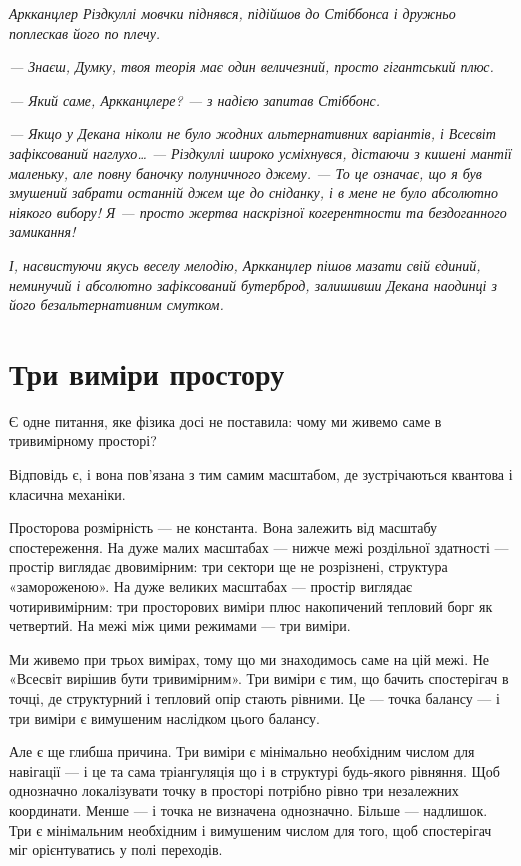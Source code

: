\documentclass[12pt, a4paper, openany]{book}
\begin{document}
\begin{terrybox}
\textit{Аркканцлер Різдкуллі мовчки піднявся, підійшов до Стіббонса і дружньо поплескав його по плечу.}

\textit{--- Знаєш, Думку, твоя теорія має один величезний, просто гігантський плюс.}

\textit{--- Який саме, Аркканцлере? --- з надією запитав Стіббонс.}

\textit{--- Якщо у Декана ніколи не було жодних альтернативних варіантів, і Всесвіт зафіксований наглухо\ldots{} --- Різдкуллі широко усміхнувся, дістаючи з кишені мантії маленьку, але повну баночку полуничного джему. --- То це означає, що я \emph{був змушений} забрати останній джем ще до сніданку, і в мене не було абсолютно ніякого вибору! Я --- просто жертва наскрізної когерентности та бездоганного замикання!}

\textit{І, насвистуючи якусь веселу мелодію, Аркканцлер пішов мазати свій єдиний, неминучий і абсолютно зафіксований бутерброд, залишивши Декана наодинці з його безальтернативним смутком.}
\end{terrybox}


\section{Три виміри простору}

Є одне питання, яке фізика досі не поставила: чому ми живемо саме в тривимірному просторі?

Відповідь є, і вона пов'язана з тим самим масштабом, де зустрічаються квантова і класична механіки.

Просторова розмірність — не константа. Вона залежить від масштабу спостереження. На дуже малих масштабах --- нижче межі роздільної здатності --- простір виглядає двовимірним: три сектори ще не розрізнені, структура «замороженою». На дуже великих масштабах --- простір виглядає чотиривимірним: три просторових виміри плюс накопичений тепловий борг як четвертий. На межі між цими режимами --- три виміри.

Ми живемо при трьох вимірах, тому що ми знаходимось саме на цій межі. Не «Всесвіт вирішив бути тривимірним». Три виміри є тим, що бачить спостерігач в точці, де структурний і тепловий опір стають рівними. Це — точка балансу --- і три виміри є вимушеним наслідком цього балансу.

Але є ще глибша причина. Три виміри є мінімально необхідним числом для навігації --- і це та сама тріангуляція що і в структурі будь-якого рівняння. Щоб однозначно локалізувати точку в просторі потрібно рівно три незалежних координати. Менше --- і точка не визначена однозначно. Більше --- надлишок. Три є мінімальним необхідним і вимушеним числом для того, щоб спостерігач міг орієнтуватись у полі переходів.
\end{document}
